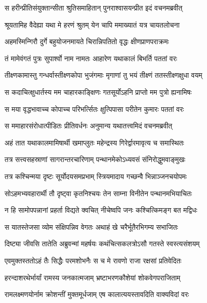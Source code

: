 \twolineshloka
{स हरीन्प्रीतिसंयुक्तान्सीता श्रुतिसमाहितान्}
{पुनराश्वासयन्प्रीत इदं वचनमब्रवीत्} %

\twolineshloka
{श्रूयतामिह वैदेह्या यथा मे हरणं श्रुतम्}
{येन चापि ममाख्यातं यत्र चायतलोचना} %

\twolineshloka
{अहमस्मिन्गिरौ दुर्गे बहुयोजनमायते}
{चिरान्निपतितो वृद्धः क्षीणप्राणपराक्रमः} %

\twolineshloka
{तं मामेवंगतं पुत्रः सुपार्श्वो नाम नामतः}
{आहारेण यथाकालं बिभर्ति पततां वरः} %

\twolineshloka
{तीक्ष्णकामास्तु गन्धर्वास्तीक्ष्णकोपा भुजंगमाः}
{मृगाणां तु भयं तीक्ष्णं ततस्तीक्ष्णक्षुधा वयम्} %

\twolineshloka
{स कदाचित्क्षुधार्तस्य मम चाहारकाङ्क्षिणः}
{गतसूर्योऽहनि प्राप्तो मम पुत्रो ह्यनामिषः} %

\twolineshloka
{स मया वृद्धभावाच्च कोपाच्च परिभर्त्सितः}
{क्षुत्पिपासा परीतेन कुमारः पततां वरः} %

\twolineshloka
{स ममाहारसंरोधात्पीडितः प्रीतिवर्धनः}
{अनुमान्य यथातत्त्वमिदं वचनमब्रवीत्} %

\twolineshloka
{अहं तात यथाकालमामिषार्थी खमाप्लुतः}
{महेन्द्रस्य गिरेर्द्वारमावृत्य च समास्थितः} %

\twolineshloka
{तत्र सत्त्वसहस्राणां सागरान्तरचारिणाम्}
{पन्थानमेकोऽध्यवसं संनिरोद्धुमवाङ्मुखः} %

\twolineshloka
{तत्र कश्चिन्मया दृष्टः सूर्योदयसमप्रभाम्}
{स्त्रियमादाय गच्छन्वै भिन्नाञ्जनचयोपमः} %

\twolineshloka
{सोऽहमभ्यवहारार्थी तौ दृष्ट्वा कृतनिश्चयः}
{तेन साम्ना विनीतेन पन्थानमभियाचितः} %

\twolineshloka
{न हि सामोपपन्नानां प्रहर्ता विद्यते क्वचित्}
{नीचेष्वपि जनः कश्चित्किमङ्ग बत मद्विधः} %

\twolineshloka
{स यातस्तेजसा व्योम संक्षिपन्निव वेगतः}
{अथाहं खे चरैर्भूतैरभिगम्य सभाजितः} %

\twolineshloka
{दिष्ट्या जीवसि तातेति अब्रुवन्मां महर्षयः}
{कथंचित्सकलत्रोऽसौ गतस्ते स्वस्त्यसंशयम्} %

\twolineshloka
{एवमुक्तस्ततोऽहं तैः सिद्धैः परमशोभनैः}
{स च मे रावणो राजा रक्षसां प्रतिवेदितः} %

\twolineshloka
{हरन्दाशरथेर्भार्यां रामस्य जनकात्मजाम्}
{भ्रष्टाभरणकौशेयां शोकवेगपराजिताम्} %

\twolineshloka
{रामलक्ष्मणयोर्नाम क्रोशन्तीं मुक्तमूर्धजाम्}
{एष कालात्ययस्तावदिति वाक्यविदां वरः} %

